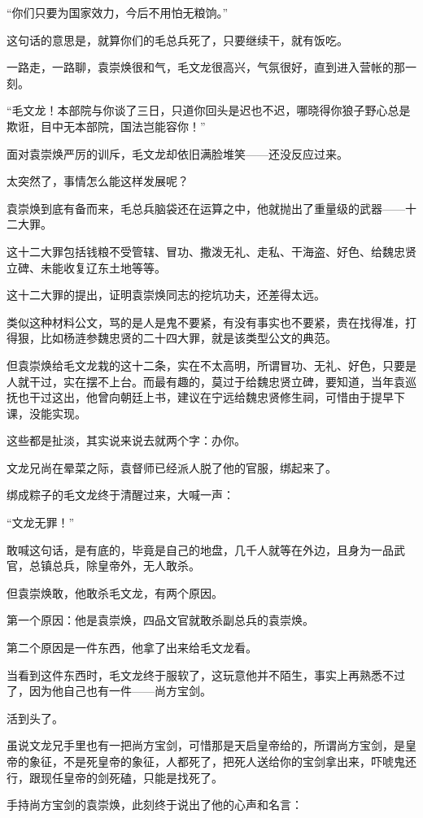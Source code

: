 \begin{multicols}{\theparacolNo}
“你们只要为国家效力，今后不用怕无粮饷。”

这句话的意思是，就算你们的毛总兵死了，只要继续干，就有饭吃。

一路走，一路聊，袁崇焕很和气，毛文龙很高兴，气氛很好，直到进入营帐的那一刻。

“毛文龙！本部院与你谈了三日，只道你回头是迟也不迟，哪晓得你狼子野心总是欺诳，目中无本部院，国法岂能容你！”

面对袁崇焕严厉的训斥，毛文龙却依旧满脸堆笑——还没反应过来。

太突然了，事情怎么能这样发展呢？

袁崇焕到底有备而来，毛总兵脑袋还在运算之中，他就抛出了重量级的武器——十二大罪。

这十二大罪包括钱粮不受管辖、冒功、撒泼无礼、走私、干海盗、好色、给魏忠贤立碑、未能收复辽东土地等等。

这十二大罪的提出，证明袁崇焕同志的挖坑功夫，还差得太远。

类似这种材料公文，骂的是人是鬼不要紧，有没有事实也不要紧，贵在找得准，打得狠，比如杨涟参魏忠贤的二十四大罪，就是该类型公文的典范。

但袁崇焕给毛文龙栽的这十二条，实在不太高明，所谓冒功、无礼、好色，只要是人就干过，实在摆不上台。而最有趣的，莫过于给魏忠贤立碑，要知道，当年袁巡抚也干过这出，他曾向朝廷上书，建议在宁远给魏忠贤修生祠，可惜由于提早下课，没能实现。

这些都是扯淡，其实说来说去就两个字：办你。

文龙兄尚在晕菜之际，袁督师已经派人脱了他的官服，绑起来了。

绑成粽子的毛文龙终于清醒过来，大喊一声：

“文龙无罪！”

敢喊这句话，是有底的，毕竟是自己的地盘，几千人就等在外边，且身为一品武官，总镇总兵，除皇帝外，无人敢杀。

但袁崇焕敢，他敢杀毛文龙，有两个原因。

第一个原因：他是袁崇焕，四品文官就敢杀副总兵的袁崇焕。

第二个原因是一件东西，他拿了出来给毛文龙看。

当看到这件东西时，毛文龙终于服软了，这玩意他并不陌生，事实上再熟悉不过了，因为他自己也有一件——尚方宝剑。

活到头了。

虽说文龙兄手里也有一把尚方宝剑，可惜那是天启皇帝给的，所谓尚方宝剑，是皇帝的象征，不是死皇帝的象征，人都死了，把死人送给你的宝剑拿出来，吓唬鬼还行，跟现任皇帝的剑死磕，只能是找死了。

手持尚方宝剑的袁崇焕，此刻终于说出了他的心声和名言：


\end{multicols}
